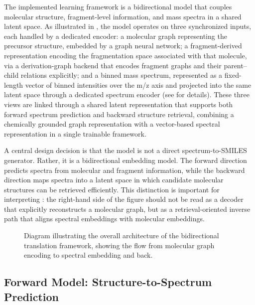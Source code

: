 The implemented learning framework is a bidirectional model that couples molecular structure, fragment-level information, and mass spectra in a shared latent space.
As illustrated in , the model operates on three synchronized inputs, each handled by a dedicated encoder: a molecular graph representing the precursor structure, embedded by a graph neural network; a fragment-derived representation encoding the fragmentation space associated with that molecule, via a derivation-graph backend that encodes fragment graphs and their parent--child relations explicitly; and a binned mass spectrum, represented as a fixed-length vector of binned intensities over the m/z axis and projected into the same latent space through a dedicated spectrum encoder (see  for details).
These three views are linked through a shared latent representation that supports both forward spectrum prediction and backward structure retrieval, combining a chemically grounded graph representation with a vector-based spectral representation in a single trainable framework.


A central design decision is that the model is not a direct spectrum-to-SMILES generator. 
Rather, it is a bidirectional embedding model. 
The forward direction predicts spectra from molecular and fragment information, while the backward direction maps spectra into a latent space in which candidate molecular structures can be retrieved efficiently. 
This distinction is important for interpreting : 
the right-hand side of the figure should not be read as a decoder that explicitly reconstructs a molecular graph, but as a retrieval-oriented inverse path that aligns spectral embeddings with molecular embeddings.

\begin{figure}[H]
    \centering
    \resizebox{\textwidth}{!}{
        
    }
    \caption[Architecture]{
        Diagram illustrating the overall architecture of the bidirectional translation framework, showing the flow from molecular graph encoding to spectral embedding and back.
    }
    \label{fig:ml-architecture-diagram}
\end{figure}

\subsection{Forward Model: Structure-to-Spectrum Prediction}

